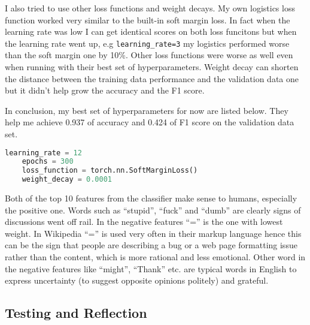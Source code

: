 \documentclass[11pt]{article} %
\begin{document}
I also tried to use other loss functions and weight decays. My own logistics loss function worked very similar to the built-in soft margin loss. In fact when the learning rate was low I can get identical scores on both loss funcitons but when the learning rate went up, e.g \verb|learning_rate=3| my logistics performed worse than the soft margin one by 10\%. Other loss functions were worse as well even when running with their best set of hyperparameters. Weight decay can shorten the distance between the training data performance and the validation data one but it didn't help grow the accuracy and the F1 score.

In conclusion, my best set of hyperparameters for now are listed below. They help me achieve 0.937 of accuracy and 0.424 of F1 score on the validation data set.

\begin{lstlisting}[language=Python]
    learning_rate = 12
    epochs = 300
    loss_function = torch.nn.SoftMarginLoss()
    weight_decay = 0.0001
\end{lstlisting}

Both of the top 10 features from the classifier make sense to humans, especially the positive one. Words such as ``stupid'', ``fuck'' and ``dumb'' are clearly signs of discussions went off rail. In the negative features ``='' is the one with lowest weight. In Wikipedia ``='' is used very often in their markup language hence this can be the sign that people are describing a bug or a web page formatting issue rather than the content, which is more rational and less emotional. Other word in the negative features like ``might'', ``Thank'' etc. are typical words in English to express uncertainty (to suggest opposite opinions politely) and grateful.

\subsection{Testing and Reflection}
\end{document}
